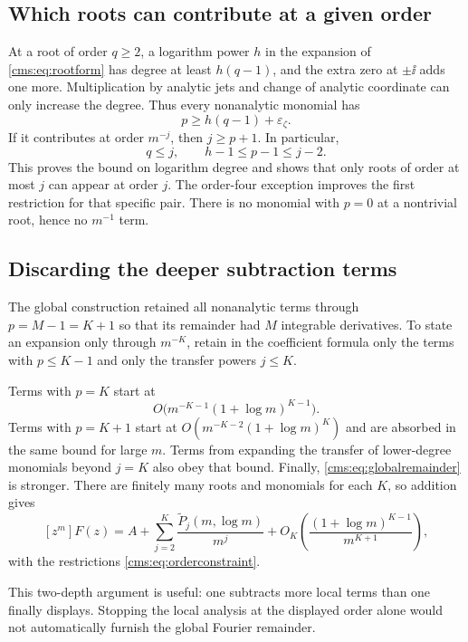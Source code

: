 \subsection{Which roots can contribute at a given order}
At a root of order $q\geq2$, a logarithm power $h$ in the expansion of \eqref{cms:eq:rootform} has degree at least $h(q-1)$, and the extra zero at $\pm\ii$ adds one more. Multiplication by analytic jets and change of analytic coordinate can only increase the degree. Thus every nonanalytic monomial has
\begin{equation}\label{cms:eq:degreeconstraint}
p\geq h(q-1)+\varepsilon_\zeta.
\end{equation}
If it contributes at order $m^{-j}$, then $j\geq p+1$. In particular,
\begin{equation}\label{cms:eq:orderconstraint}
q\leq j,\qquad h-1\leq p-1\leq j-2.
\end{equation}
This proves the bound on logarithm degree and shows that only roots of order at most $j$ can appear at order $j$. The order-four exception improves the first restriction for that specific pair. There is no monomial with $p=0$ at a nontrivial root, hence no $m^{-1}$ term.

\subsection{Discarding the deeper subtraction terms}
The global construction retained all nonanalytic terms through $p=M-1=K+1$ so that its remainder had $M$ integrable derivatives. To state an expansion only through $m^{-K}$, retain in the coefficient formula only the terms with $p\leq K-1$ and only the transfer powers $j\leq K$.

Terms with $p=K$ start at
\[
O\bigl(m^{-K-1}(1+\log m)^{K-1}\bigr).
\]
Terms with $p=K+1$ start at $O(m^{-K-2}(1+\log m)^K)$ and are absorbed in the same bound for large $m$. Terms from expanding the transfer of lower-degree monomials beyond $j=K$ also obey that bound. Finally, \eqref{cms:eq:globalremainder} is stronger. There are finitely many roots and monomials for each $K$, so addition gives
\begin{equation}\label{cms:eq:mexpansion}
[z^m]F(z)=A+
\sum_{j=2}^{K}\frac{\widetilde P_j(m,\log m)}{m^j}
+O_K\!\left(\frac{(1+\log m)^{K-1}}{m^{K+1}}\right),
\end{equation}
with the restrictions \eqref{cms:eq:orderconstraint}.

This two-depth argument is useful: one subtracts more local terms than one finally displays. Stopping the local analysis at the displayed order alone would not automatically furnish the global Fourier remainder.

